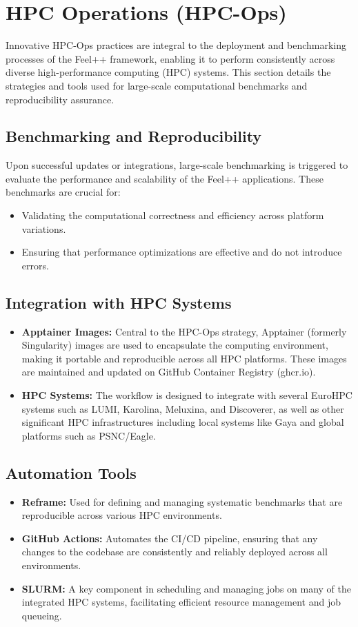 \documentclass[runningheads]{llncs}
\begin{document}
\section{HPC Operations (HPC-Ops)}
Innovative HPC-Ops practices are integral to the deployment and benchmarking processes of the Feel++ framework, enabling it to perform consistently across diverse high-performance computing (HPC) systems. This section details the strategies and tools used for large-scale computational benchmarks and reproducibility assurance.

\subsection{Benchmarking and Reproducibility}
Upon successful updates or integrations, large-scale benchmarking is triggered to evaluate the performance and scalability of the Feel++ applications. These benchmarks are crucial for:
\begin{itemize}
    \item Validating the computational correctness and efficiency across platform variations.
    \item Ensuring that performance optimizations are effective and do not introduce errors.
\end{itemize}

\subsection{Integration with HPC Systems}
\begin{itemize}
    \item \textbf{Apptainer Images:} Central to the HPC-Ops strategy, Apptainer (formerly Singularity) images are used to encapsulate the computing environment, making it portable and reproducible across all HPC platforms. These images are maintained and updated on GitHub Container Registry (ghcr.io).
    \item \textbf{HPC Systems:} The workflow is designed to integrate with several EuroHPC systems such as LUMI, Karolina, Meluxina, and Discoverer, as well as other significant HPC infrastructures including local systems like Gaya and global platforms such as PSNC/Eagle.
\end{itemize}

\subsection{Automation Tools}
\begin{itemize}
    \item \textbf{Reframe:} Used for defining and managing systematic benchmarks that are reproducible across various HPC environments.
    \item \textbf{GitHub Actions:} Automates the CI/CD pipeline, ensuring that any changes to the codebase are consistently and reliably deployed across all environments.
    \item \textbf{SLURM:} A key component in scheduling and managing jobs on many of the integrated HPC systems, facilitating efficient resource management and job queueing.
\end{itemize}
\end{document}
